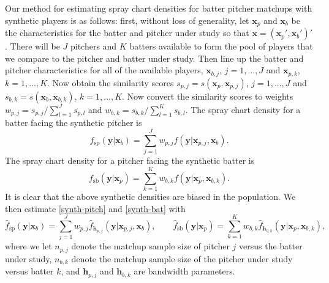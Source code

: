 \documentclass[11pt]{article}
\newcommand{\R}{\mathbb{R}}
\newcommand{\Xbf}{\textbf{X}}
\newcommand{\V}{\textbf{V}}
\newcommand{\W}{\textbf{W}}
\newcommand{\y}{\textbf{y}}
\newcommand{\x}{\textbf{x}}
\newcommand{\h}{\textbf{h}}
\newcommand{\Wstar}{\W^{\textstyle{*}}}
\begin{document}
Our method for estimating spray chart densities for batter pitcher matchups with synthetic players is as follows: first, without loss of generality, let $\x_p$ and $\x_b$ be the characteristics for the batter and pitcher under study so that $\x = (\x_p',\x_b')'$. There will be $J$ pitchers and $K$ batters available to form the pool of players that we compare to the pitcher and batter under study. Then line up the batter and pitcher characteristics for all of the available players, $\x_{b,j}$, $j = 1,...,J$ and $\x_{p,k}$, $k = 1,...,K$. Now obtain the similarity scores $s_{p,j} = s(\x_p,\x_{p,j})$, $j = 1,...,J$ and $s_{b,k} = s(\x_b,\x_{b,k})$, $k = 1,...,K$. Now convert the similarity scores to weights $w_{p,j} = s_{p,j} / \sum_{l=1}^{J}s_{p,l}$ and $w_{b,k} = s_{b,k} / \sum_{l=1}^{K}s_{b,l}$. The spray chart density for a batter facing the synthetic pitcher is 
\begin{equation} \label{synth-pitch}
  f_{\text{sp}}(\y|\x_b) = \sum_{j=1}^J w_{p,j}f(\y|\x_{p,j},\x_b).
\end{equation}
The spray chart density for a pitcher facing the synthetic batter is 
\begin{equation} \label{synth-bat}
  f_{\text{sb}}(\y|\x_p) = \sum_{k=1}^K w_{b,k}f(\y|\x_p,\x_{b,k}).
\end{equation}
It is clear that the above synthetic densities are biased in the population. We then estimate \eqref{synth-pitch} and \eqref{synth-bat} with
\begin{equation} \label{synth-est}
  \hat f_{\text{sp}}(\y|\x_b) = \sum_{j=1}^J w_{p,j}\hat f_{\h_{p,j}}(\y|\x_{p,j},\x_b), 
  \qquad
  \hat f_{\text{sb}}(\y|\x_p) = \sum_{k=1}^K w_{b,k}\hat f_{\h_{b,k}}(\y|\x_p,\x_{b,k}),
\end{equation}
where we let $n_{p,j}$ denote the matchup sample size of pitcher $j$ versus the batter under study, $n_{b,k}$ denote the matchup sample size of the pitcher under study versus batter $k$, and $\h_{p,j}$ and $\h_{b,k}$ are bandwidth parameters.

\end{document}

